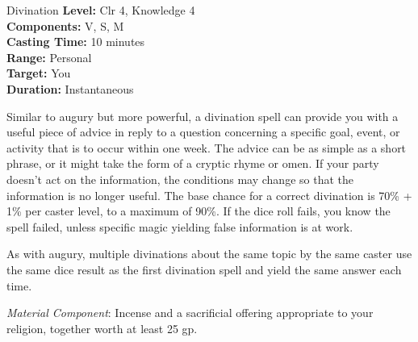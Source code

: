 {Divination}
{
	\textbf{Level:}
	Clr 4, Knowledge 4\\
	\textbf{Components:}
	V, S, M\\
	\textbf{Casting Time:}
	10 minutes\\
	\textbf{Range:}
	Personal\\
	\textbf{Target:}
	You\\
	\textbf{Duration:}
	Instantaneous\\
}
{
	Similar to augury but more powerful, a divination spell can provide you with a useful piece of advice in reply to a question concerning a specific goal, event, or activity that is to occur within one week. The advice can be as simple as a short phrase, or it might take the form of a cryptic rhyme or omen. If your party doesn't act on the information, the conditions may change so that the information is no longer useful. The base chance for a correct divination is 70\% + 1\% per caster level, to a maximum of 90\%. If the dice roll fails, you know the spell failed, unless specific magic yielding false information is at work.

	As with augury, multiple divinations about the same topic by the same caster use the same dice result as the first divination spell and yield the same answer each time.

	\textit{Material Component}:
	Incense and a sacrificial offering appropriate to your religion, together worth at least 25 gp.

}
